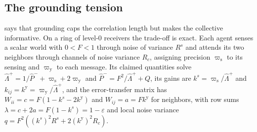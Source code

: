 \subsection{The grounding tension}\label{sec:coh-tension}

 says that grounding caps the correlation length but makes the collective informative. On a ring of level-0 receivers the trade-off is exact. Each agent senses a scalar world with $0<F<1$ through noise of variance $R^s$ and attends its two neighbors through channels of noise variance $R_c$, assigning precision $\varpi_{\mathrm s}$ to its sensing and $\varpi_{\mathrm y}$ to each message. Its claimed quantities solve $\hat\Lambda^+=1/\hat P^-+\varpi_{\mathrm s}+2\varpi_{\mathrm y}$ and $\hat P^-=F^2/\hat\Lambda^++Q$, its gains are $k^s=\varpi_{\mathrm s}/\hat\Lambda^+$ and $k_{ij}=k^{\mathrm y}=\varpi_{\mathrm y}/\hat\Lambda^+$, and the error-transfer matrix has $W_{ii}=c=F(1-k^s-2k^{\mathrm y})$ and $W_{ij}=a=Fk^{\mathrm y}$ for neighbors, with row sums $\lambda=c+2a=F(1-k^s)=1-\varepsilon$ and local noise variance $q=F^2((k^s)^2R^s+2(k^{\mathrm y})^2R_c)$.

